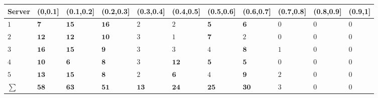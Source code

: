 
\begin{tabular}{l|l|l|l|l|l|l|l|l|l|l}
\hline
Server & (0,0.1] & (0.1,0.2] & (0.2,0.3] & (0.3,0.4] & (0.4,0.5] & (0.5,0.6] & (0.6,0.7] & (0.7,0.8] & (0.8,0.9] & (0.9,1]\\
\hline
$1$ & $\bm{7}$ & $\bm{15}$ & $\bm{16}$ & $2$ & $2$ & $\bm{5}$ & $\bm{6}$ & $0$ & $0$ & $0$\\
\hline
$2$ & $\bm{12}$ & $\bm{12}$ & $\bm{10}$ & $3$ & $1$ & $\bm{7}$ & $2$ & $0$ & $0$ & $0$\\
\hline
$3$ & $\bm{16}$ & $\bm{15}$ & $\bm{9}$ & $3$ & $3$ & $4$ & $\bm{8}$ & $1$ & $0$ & $0$\\
\hline
$4$ & $\bm{10}$ & $\bm{6}$ & $\bm{8}$ & $3$ & $\bm{12}$ & $\bm{5}$ & $\bm{5}$ & $0$ & $0$ & $0$\\
\hline
$5$ & $\bm{13}$ & $\bm{15}$ & $\bm{8}$ & $2$ & $\bm{6}$ & $4$ & $\bm{9}$ & $2$ & $0$ & $0$\\
\hline
$\sum$ & $\bm{58}$ & $\bm{63}$ & $\bm{51}$ & $\bm{13}$ & $\bm{24}$ & $\bm{25}$ & $\bm{30}$ & $3$ & $0$ & $0$\\
\hline
\end{tabular}
